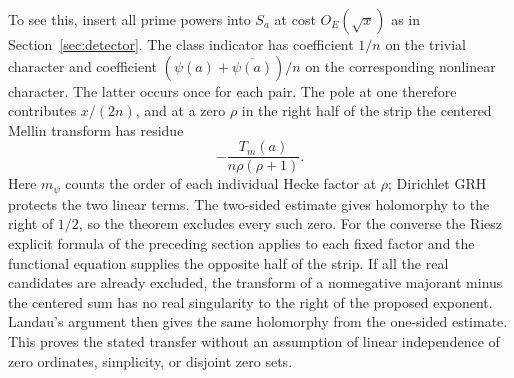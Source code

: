 To see this, insert all prime powers into $S_a$ at cost $O_E(\sqrt x)$ as in Section~\ref{sec:detector}. The class indicator has coefficient $1/n$ on the trivial character and coefficient $(\psi(a)+\overline{\psi(a)})/n$ on the corresponding nonlinear character. The latter occurs once for each pair. The pole at one therefore contributes $x/(2n)$, and at a zero $\rho$ in the right half of the strip the centered Mellin transform has residue
\[
                    -\frac{T_m(a)}{n\rho(\rho+1)}.
\]
Here $m_\psi$ counts the order of each individual Hecke factor at $\rho$; Dirichlet GRH protects the two linear terms. The two-sided estimate gives holomorphy to the right of $1/2$, so the theorem excludes every such zero. For the converse the Riesz explicit formula of the preceding section applies to each fixed factor and the functional equation supplies the opposite half of the strip. If all the real candidates are already excluded, the transform of a nonnegative majorant minus the centered sum has no real singularity to the right of the proposed exponent. Landau's argument then gives the same holomorphy from the one-sided estimate. This proves the stated transfer without an assumption of linear independence of zero ordinates, simplicity, or disjoint zero sets.
